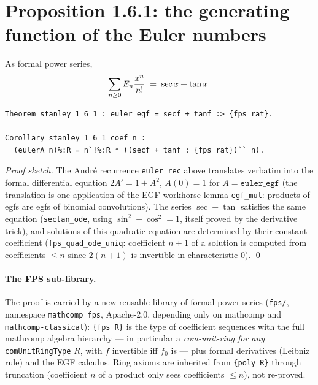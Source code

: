 \section{Proposition 1.6.1: the generating function of the Euler
  numbers}

\begin{theorem}
  As formal power series,
  \[
    \sum_{n \geq 0} E_n \frac{x^n}{n!} \;=\; \sec x + \tan x.
  \]
\end{theorem}

\begin{lstlisting}[language=Rocq]
Theorem stanley_1_6_1 : euler_egf = secf + tanf :> {fps rat}.

Corollary stanley_1_6_1_coef n :
  (eulerA n)%:R = n`!%:R * ((secf + tanf : {fps rat})``_n).
\end{lstlisting}


\noindent
\emph{Proof sketch.} The Andr\'e recurrence \texttt{euler\_rec}
above translates verbatim into the formal differential equation
$2A' = 1 + A^2$, $A(0) = 1$ for $A = \texttt{euler\_egf}$ (the
translation is one application of the EGF workhorse lemma
\texttt{egf\_mul}: products of egfs are egfs of binomial
convolutions).  The series $\sec + \tan$ satisfies the same
equation (\texttt{sectan\_ode}, using $\sin^2 + \cos^2 = 1$, itself
proved by the derivative trick), and solutions of this quadratic
equation are determined by their constant coefficient
(\texttt{fps\_quad\_ode\_uniq}: coefficient $n{+}1$ of a solution
is computed from coefficients $\leq n$ since $2(n{+}1)$ is
invertible in characteristic $0$). \qed

\paragraph{The FPS sub-library.} The proof is carried by a new
reusable library of formal power series (\texttt{fps/}, namespace
\texttt{mathcomp\_fps}, Apache-2.0, depending only on mathcomp and
\texttt{mathcomp-classical}): \texttt{\{fps R\}} is the type of
coefficient sequences with the full mathcomp algebra hierarchy ---
in particular a \emph{com-unit-ring for any}
\texttt{comUnitRingType} $R$, with $f$ invertible iff $f_0$ is ---
plus formal derivatives (Leibniz rule) and the EGF calculus.  Ring
axioms are inherited from \texttt{\{poly R\}} through truncation
(coefficient $n$ of a product only sees coefficients $\leq n$), not
re-proved.

